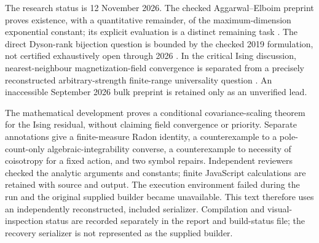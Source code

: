 The research status is 12 November 2026. The checked Aggarwal--Elboim preprint
proves existence, with a quantitative remainder, of the maximum-dimension
exponential constant; its explicit evaluation is a distinct remaining task
\citep{aggarwalelboim2026maximal}. The direct Dyson-rank bijection question is
bounded by the checked 2019 formulation, not certified exhaustively open
through 2026 \citep{stanton2019rankcrank}. In the critical Ising discussion,
nearest-neighbour magnetization-field convergence is separated from a
precisely reconstructed arbitrary-strength finite-range universality question
\citep{camia2015magnetization,cavagiulianigreenblatt2025boundary}.
An inaccessible September 2026 bulk preprint is retained only as an
unverified lead.

The mathematical development proves a conditional covariance-scaling theorem
for the Ising residual, without claiming field convergence or priority.
Separate annotations give a finite-measure Radon identity, a counterexample
to a pole-count-only algebraic-integrability converse, a counterexample to
necessity of coisotropy for a fixed action, and two symbol repairs.
Independent reviewers checked the analytic arguments and constants; finite
JavaScript calculations are retained with source and output.
The execution environment failed during the run and the original supplied
builder became unavailable. This text therefore uses an independently
reconstructed, included serializer. Compilation and visual-inspection status
are recorded separately in the report and build-status file; the recovery
serializer is not represented as the supplied builder.
